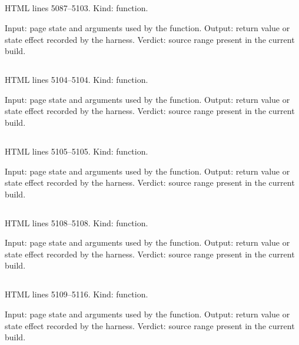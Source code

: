 \subsection*{\texttt{}}
\label{vf_222_wireSop}
HTML lines 5087--5103. Kind: function.

Input: page state and arguments used by the function.
Output: return value or state effect recorded by the harness.
Verdict: source range present in the current build.

\subsection*{\texttt{}}
\label{vf_223_renderSop}
HTML lines 5104--5104. Kind: function.

Input: page state and arguments used by the function.
Output: return value or state effect recorded by the harness.
Verdict: source range present in the current build.

\subsection*{\texttt{}}
\label{vf_224_renderResults}
HTML lines 5105--5105. Kind: function.

Input: page state and arguments used by the function.
Output: return value or state effect recorded by the harness.
Verdict: source range present in the current build.

\subsection*{\texttt{}}
\label{vf_225_svgEsc}
HTML lines 5108--5108. Kind: function.

Input: page state and arguments used by the function.
Output: return value or state effect recorded by the harness.
Verdict: source range present in the current build.

\subsection*{\texttt{}}
\label{vf_226_niceTicks}
HTML lines 5109--5116. Kind: function.

Input: page state and arguments used by the function.
Output: return value or state effect recorded by the harness.
Verdict: source range present in the current build.

